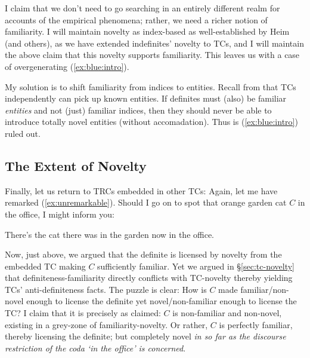 \documentclass[11pt]{article}
\begin{document}
I claim that we don't need to go searching in an entirely different realm for accounts of the empirical phenomena; rather, we need a richer notion of familiarity. I will maintain novelty as index-based as well-established by Heim (and others), as we have extended indefinites' novelty to TCs, and I will maintain the above claim that this novelty supports familiarity. This leaves us with a case of overgenerating (\ref{ex:blue:intro}).

My solution is to shift familiarity from indices to entities. Recall from \citet{abbottDefinitenessExistentials1997} that TCs independently can pick up known entities. If definites must (also) be familiar \textit{entities} and not (just) familiar indices, then they should never be able to introduce totally novel entities (without accomadation). Thus is (\ref{ex:blue:intro}) ruled out.


\subsection{The Extent of Novelty}\label{sec:novelty}
Finally, let us return to TRCs embedded in other TCs: Again, let me have remarked (\ref{ex:unremarkable}). Should I go on to spot that orange garden cat \(C\) in the office, I might inform you:

\begin{resexe}
	\item[(\ref{ex:tc-trc})] There's the cat there was in the garden now in the office.
\end{resexe}

Now, just above, we argued that the definite is licensed by novelty from the embedded TC making \(C\) sufficiently familiar. Yet we argued in \S\ref{sec:tc-novelty} that definiteness-familiarity directly conflicts with TC-novelty thereby yielding TCs' anti-definiteness facts. The puzzle is clear: How is \(C\) made familiar/non-novel enough to license the definite yet novel/non-familiar enough to license the TC? I claim that it is precisely as claimed: \(C\) is non-familiar and non-novel, existing in a grey-zone of familiarity-novelty. Or rather, \(C\) is perfectly familiar, thereby licensing the definite; but completely novel \textit{in so far as the discourse restriction of the coda `in the office' is concerned}.
\end{document}
